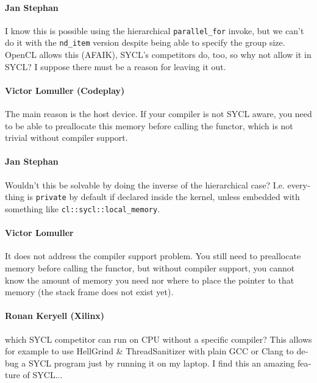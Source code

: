 \begin{otherlanguage}{english}
    \paragraph{Jan Stephan} I know this is possible using the hierarchical
                            \texttt{parallel\_for} invoke, but we can't do it
                            with the \texttt{nd\_item} version despite being
                            able to specify the group size. OpenCL allows this
                            (AFAIK), SYCL's competitors do, too, so why not
                            allow it in SYCL? I suppose there must be a reason
                            for leaving it out.
    \paragraph{Victor Lomuller (Codeplay)} The main reason is the host device.
                            If your compiler is not SYCL aware, you need to be
                            able to preallocate this memory before calling the
                            functor, which is not trivial without compiler
                            support.
    \paragraph{Jan Stephan} Wouldn't this be solvable by doing the inverse of
                            the hierarchical case? I.e. everything is
                            \texttt{private} by default if declared inside the
                            kernel, unless embedded with something like
                            \texttt{cl::sycl::local\_memory}.
    \paragraph{Victor Lomuller} It does not address the compiler support
                                problem. You still need to preallocate memory
                                before calling the functor, but without compiler
                                support, you cannot know the amount of memory
                                you need nor where to place the pointer to that
                                memory (the stack frame does not exist yet).
    \paragraph{Ronan Keryell (Xilinx)} which SYCL competitor can run on CPU
                              without a specific compiler? This allows for
                              example to use HellGrind \& ThreadSanitizer with
                              plain GCC or Clang to debug a SYCL program just by
                              running it on my laptop. I find this an amazing
                              feature of SYCL...
\end{otherlanguage}

